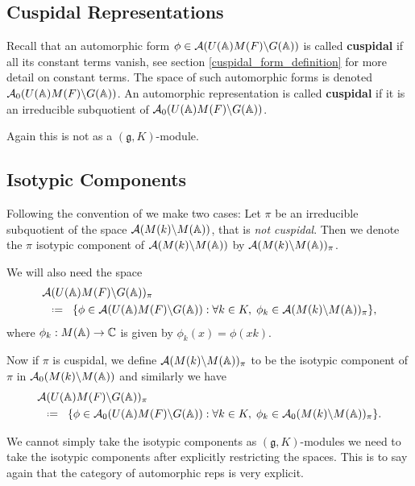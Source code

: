 \subsection{Cuspidal Representations}
Recall that an automorphic form \(\phi\in \mathcal{A}(U(\A)M(F) \backslash G(\A))\) is called \textbf{cuspidal}  if all its constant terms vanish, see section \ref{cuspidal_form_definition} for more detail on constant terms.
The space of such automorphic forms is denoted \(\mathcal{A}_0(U(\A)M(F) \backslash G(\A))\). An automorphic representation is called \textbf{cuspidal} if it is an irreducible subquotient of \(\mathcal{A}_0(U(\A)M(F) \backslash G(\A))\).

\begin{remark}
    Again this is not as a \((\mathfrak{g}, K)\)-module.
\end{remark}

\subsection{Isotypic Components}\label{automorphic_isotypic_subspaces}
Following the convention of \cite[II.1]{moeglinSpectralDecompositionEisenstein1995} we make two cases:
Let \(\pi\) be an irreducible subquotient of the space \(\mathcal{A}(M(k) \backslash M(\A))\), that is \textit{not cuspidal}. Then we denote the \(\pi\) isotypic component of \(\mathcal{A}(M(k) \backslash M(\A))\) by \(\mathcal{A}(M(k) \backslash M(\A))_\pi\).

We will also need the space 
\begin{align*}
	&\mathcal{A}(U(\A)M(F) \backslash G(\A))_\pi \\ &\defeq \{\phi \in \mathcal{A}(U(\A)M(F) \backslash G(\A)) : \forall k\in K, \; \phi_k\in\mathcal{A}(M(k) \backslash M(\A))_\pi \},
\end{align*}
where \(\phi_k: M(\A) \to \C\) is given by \(\phi_k(x) = \phi(xk)\).

Now if \(\pi\) is cuspidal, we define \(\mathcal{A}(M(k) \backslash M(\A))_\pi\) to be the isotypic component of \(\pi\) in \(\mathcal{A}_0(M(k) \backslash M(\A))\) and similarly we have 
\begin{align*}
	&\mathcal{A}(U(\A)M(F) \backslash G(\A))_\pi \\
&\defeq \{\phi \in \mathcal{A}_0(U(\A)M(F) \backslash G(\A)) : \forall k\in K, \; \phi_k\in\mathcal{A}_0(M(k) \backslash M(\A))_{\pi} \}.
\end{align*}

\begin{remark}
    We cannot simply take the isotypic components as \((\mathfrak{g}, K)\)-modules we need to take the isotypic components after explicitly restricting the spaces. This is to say again that the category of automorphic reps is very explicit. 
\end{remark}

